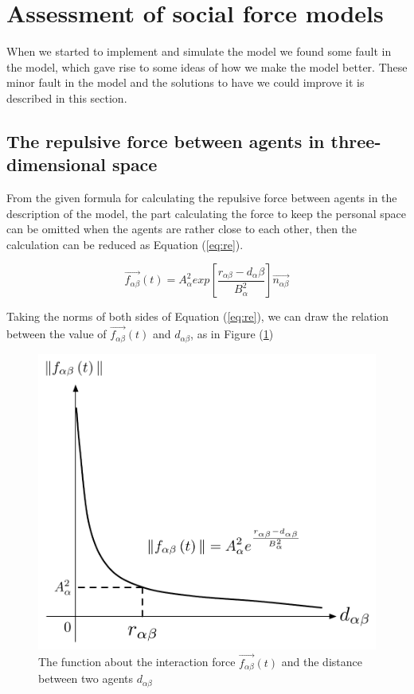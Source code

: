 \section{Assessment of social force models}
\label{sec:assessment}
When we started to implement and simulate the model we found some fault
in the model, which gave rise to some ideas of how we make the model better.
These minor fault in the model and the solutions to have we could improve it
is described in this section.

\subsection{The repulsive force between agents in three-dimensional space}
From the given formula for calculating the repulsive force between agents in the 
description of the model, the part calculating the force to keep the personal space 
can be omitted when the agents are rather close to each other, then the calculation 
can be reduced as Equation (\ref{eq:re}).

\begin{equation}\label{eq:re}
\overrightarrow{f_{\alpha\beta}}(t) = A_{\alpha}^{2} exp\left[ \frac{r_{\alpha\beta} - d_{\alpha}\beta}{B_{\alpha}^{2}}\right]  \overrightarrow{n_{\alpha\beta}}
\end{equation}

Taking the norms of both sides of Equation (\ref{eq:re}), we can draw the relation 
between the value of $\overrightarrow{f_{\alpha\beta}}(t)$ and $d_{\alpha \beta}$, 
as in Figure (\ref{fig:physicalinteraction})
\\
\begin{figure}
\centering
\includegraphics[scale=0.45]{Figures/physicalinteraction.pdf} 
\caption{The function about the interaction force $\vec{f_{\alpha\beta}}(t)$ and the distance between two agents
$d_{\alpha\beta}$ }\label{fig:physicalinteraction}
\end{figure}

